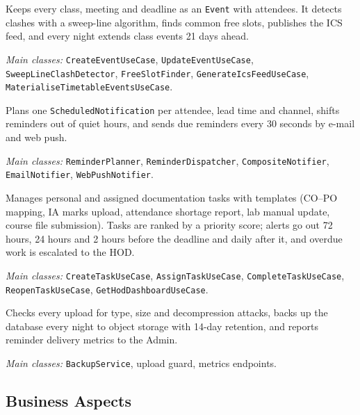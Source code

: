 Keeps every class, meeting and deadline as an \texttt{Event} with attendees. It detects clashes with a sweep-line algorithm, finds common free slots, publishes the ICS feed, and every night extends class events 21 days ahead.\par\smallskip
{\RaggedRight\textit{Main classes:} \texttt{CreateEventUseCase}, \texttt{UpdateEventUseCase}, \texttt{SweepLineClashDetector}, \texttt{FreeSlotFinder}, \texttt{GenerateIcsFeedUseCase}, \texttt{MaterialiseTimetableEventsUseCase}.\par}

Plans one \texttt{ScheduledNotification} per attendee, lead time and channel, shifts reminders out of quiet hours, and sends due reminders every 30 seconds by e-mail and web push.\par\smallskip
{\RaggedRight\textit{Main classes:} \texttt{ReminderPlanner}, \texttt{ReminderDispatcher}, \texttt{CompositeNotifier}, \texttt{EmailNotifier}, \texttt{WebPushNotifier}.\par}

Manages personal and assigned documentation tasks with templates (CO--PO mapping, IA marks upload, attendance shortage report, lab manual update, course file submission). Tasks are ranked by a priority score; alerts go out 72 hours, 24 hours and 2 hours before the deadline and daily after it, and overdue work is escalated to the HOD.\par\smallskip
{\RaggedRight\textit{Main classes:} \texttt{CreateTaskUseCase}, \texttt{AssignTaskUseCase}, \texttt{CompleteTaskUseCase}, \texttt{ReopenTaskUseCase}, \texttt{GetHodDashboardUseCase}.\par}

Checks every upload for type, size and decompression attacks, backs up the database every night to object storage with 14-day retention, and reports reminder delivery metrics to the Admin.\par\smallskip
{\RaggedRight\textit{Main classes:} \texttt{BackupService}, upload guard, metrics endpoints.\par}

\subsection{Business Aspects}

